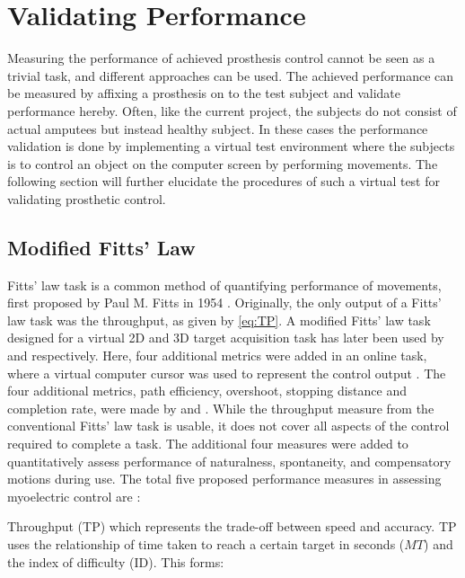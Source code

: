 
\section{Validating Performance} \label{sec:BG:validatingPerformance}

Measuring the performance of achieved prosthesis control cannot be seen as a trivial task, and different approaches can be used. The achieved performance can be measured by affixing a prosthesis on to the test subject and validate performance hereby. Often, like the current project, the subjects do not consist of actual amputees but instead healthy subject. In these cases the performance validation is done by implementing a virtual test environment where the subjects is to control an object on the computer screen by performing movements. The following section will further elucidate the procedures of such a virtual test for validating prosthetic control.      


\subsection{Modified Fitts' Law} \label{sub:BG:fitts}

Fitts' law task is a common method of quantifying performance of movements, first proposed by Paul M. Fitts in 1954 \cite{Fitts1954}. Originally, the only output of a Fitts' law task was the throughput, as given by \eqref{eq:TP}. A modified Fitts' law task designed for a virtual 2D and 3D target acquisition task has later been used by \cite{Kamavuako2014} and \cite{Scheme2013} respectively. Here, four additional metrics were added in an online task, where a virtual computer cursor was used to represent the control output \cite{Scheme2013, Kamavuako2014}. The four additional metrics, path efficiency, overshoot, stopping distance and completion rate, were made by \cite{Poulton2013} and \cite{Simon2011}. While the throughput measure from the conventional Fitts' law task is usable, it does not cover all aspects of the control required to complete a task. The additional four measures were added to quantitatively assess performance of naturalness, spontaneity, and compensatory motions during use. The total five proposed performance measures in assessing myoelectric control are \cite{Scheme2013a}: 

Throughput (TP) which represents the trade-off between speed and accuracy. TP uses the relationship of time taken to reach a certain target in seconds ($MT$) and the index of difficulty (ID). This forms: \cite{Scheme2013,Fitts1954}

